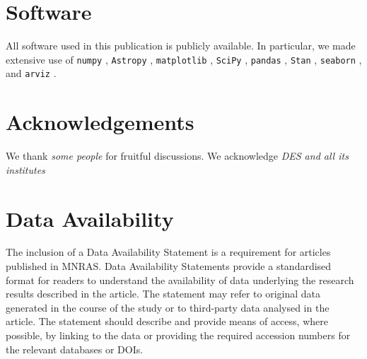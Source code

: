\documentclass[fleqn,usenatbib]{mnras}
\begin{document}
\section*{Software}

All software used in this publication is publicly available. In particular, we made extensive use of \texttt{numpy} \citep{Harris2020}, \texttt{Astropy} \citep{AstropyCollaboration2013,AstropyCollaboration2018}, \texttt{matplotlib} \citep{Hunter2007}, \texttt{SciPy} \citep{Virtanen2020}, \texttt{pandas} \citep{Mckinney2010}, \texttt{Stan} \citep{Carpenter2017}, \texttt{seaborn} \citep{Waskom2020}, and \texttt{arviz} \citep{Kumar2019}.

\section*{Acknowledgements}

We thank \textit{some people} for fruitful discussions. 
We acknowledge \textit{DES and all its institutes}

\section*{Data Availability}

 
The inclusion of a Data Availability Statement is a requirement for articles published in MNRAS. Data Availability Statements provide a standardised format for readers to understand the availability of data underlying the research results described in the article. The statement may refer to original data generated in the course of the study or to third-party data analysed in the article. The statement should describe and provide means of access, where possible, by linking to the data or providing the required accession numbers for the relevant databases or DOIs.








\end{document}
